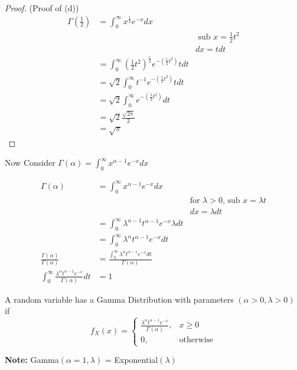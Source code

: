 \documentclass[12pt, twoside]{article}
\begin{document}
\begin{enumerate}
{	\begin{proof}
		(Proof of (d))\\
		\begin{align*}
			\Gamma (\frac{1}{2}) &= \int^\infty_0 x^{\frac{1}{2}} e^{-x} dx\\
			&& \text{ sub } x = \frac{1}{2}t^2\\
			&& dx = t dt\\
			&= \int^\infty_0 (\frac{1}{2}t^2)^{\frac{1}{2}} e^{-(\frac{1}{2}t^2)} t dt\\
			&= \sqrt{2} \int^\infty_0 t^{-1} e^{-(\frac{1}{2}t^2)} t dt\\
			&= \sqrt{2} \int^\infty_0 e^{-(\frac{1}{2}t^2)} dt\\
			&= \sqrt{2} \frac{\sqrt{2\pi}}{2}\\
			&= \sqrt{\pi}
		\end{align*}

	\end{proof}
	
	Now Consider $\Gamma (\alpha) = \int^\infty_0 x^{\alpha - 1} e^{-x} dx$

	\begin{align*}
		\Gamma (\alpha) &= \int^\infty_0 x^{\alpha - 1} e^{-x} dx\\
		&& \text{for $\lambda > 0$, sub } x = \lambda t\\
		&& dx = \lambda dt\\
		&= \int^\infty_0 \lambda^{\alpha - 1} t^{\alpha - 1} e^{-x} \lambda dt\\
		&= \int^\infty_0 \lambda^{\alpha} t^{\alpha - 1} e^{-x} dt\\
		\frac{\Gamma (\alpha)}{\Gamma (\alpha)} &= \frac{\int^\infty_0 \lambda^{\alpha} t^{\alpha - 1} e^{-x} dt}{\Gamma (\alpha)}\\
		\int^\infty_0 \frac{\lambda^{\alpha} t^{\alpha - 1} e^{-x}}{\Gamma (\alpha)} dt &= 1
	\end{align*}
	
	\begin{tcolorbox}[title=Definition: Gamma Distribution]
		A random variable has a Gamma Distribution with parameters $(\alpha > 0, \lambda > 0)$ if
		$$f_X (x) = 
		\begin{cases}
		\frac{\lambda^{\alpha} t^{\alpha - 1} e^{-x}}{\Gamma (\alpha)}, & x \geq 0\\
		0, & \text{otherwise}
		\end{cases}
$$
	\end{tcolorbox}

	\textbf{Note:} Gamma$(\alpha = 1, \lambda)$ = Exponential$(\lambda)$
	
}
\end{enumerate}
\end{document}
